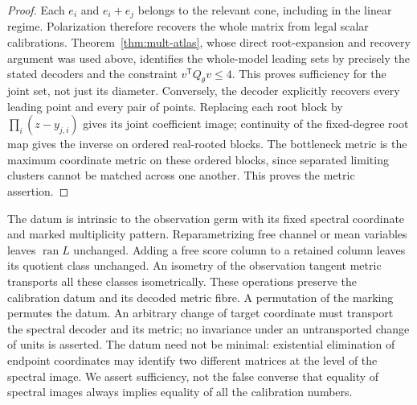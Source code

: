 \begin{proof}
Each $e_i$ and $e_i+e_j$ belongs to the relevant cone, including in the
linear regime. Polarization therefore recovers the whole matrix from
legal scalar calibrations. Theorem~\ref{thm:mult-atlas}, whose direct
root-expansion and recovery argument was used above, identifies the
whole-model leading sets by precisely the stated decoders and the
constraint $v^{\mathsf T}Q_\theta v\le4$. This proves sufficiency for
the joint set, not just its diameter. Conversely, the decoder explicitly
recovers every leading point and every pair of points. Replacing each
root block by $\prod_i(z-y_{j,i})$ gives its joint coefficient image;
continuity of the fixed-degree root map gives the inverse on ordered
real-rooted blocks. The bottleneck metric is the maximum coordinate
metric on these ordered blocks, since separated limiting clusters cannot
be matched across one another. This proves the metric assertion.
\end{proof}

\begin{remark}\label{rem:v101-marking}
The datum is intrinsic to the observation germ with its fixed spectral
coordinate and marked multiplicity pattern. Reparametrizing free channel
or mean variables leaves $\operatorname{ran}L$ unchanged. Adding a free
score column to a retained column leaves its quotient class unchanged.
An isometry of the observation tangent metric transports all these
classes isometrically. These operations preserve the calibration datum
and its decoded metric fibre. A permutation of the marking permutes the
datum. An arbitrary change of target coordinate must transport the
spectral decoder and its metric; no invariance under an untransported
change of units is asserted. The datum need not be minimal: existential
elimination of endpoint coordinates may identify two different matrices
at the level of the spectral image. We assert sufficiency, not the false
converse that equality of spectral images always implies equality of
all the calibration numbers.
\end{remark}

